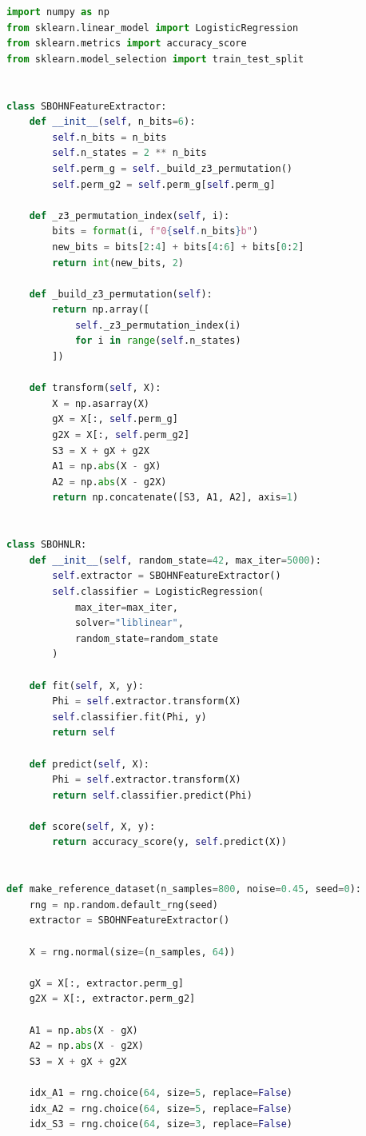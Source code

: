 \documentclass[11pt,a4paper]{report}
\begin{document}
\label{app:ch3-lst14}
\begin{lstlisting}[language=Python]
import numpy as np
from sklearn.linear_model import LogisticRegression
from sklearn.metrics import accuracy_score
from sklearn.model_selection import train_test_split


class SBOHNFeatureExtractor:
    def __init__(self, n_bits=6):
        self.n_bits = n_bits
        self.n_states = 2 ** n_bits
        self.perm_g = self._build_z3_permutation()
        self.perm_g2 = self.perm_g[self.perm_g]

    def _z3_permutation_index(self, i):
        bits = format(i, f"0{self.n_bits}b")
        new_bits = bits[2:4] + bits[4:6] + bits[0:2]
        return int(new_bits, 2)

    def _build_z3_permutation(self):
        return np.array([
            self._z3_permutation_index(i)
            for i in range(self.n_states)
        ])

    def transform(self, X):
        X = np.asarray(X)
        gX = X[:, self.perm_g]
        g2X = X[:, self.perm_g2]
        S3 = X + gX + g2X
        A1 = np.abs(X - gX)
        A2 = np.abs(X - g2X)
        return np.concatenate([S3, A1, A2], axis=1)


class SBOHNLR:
    def __init__(self, random_state=42, max_iter=5000):
        self.extractor = SBOHNFeatureExtractor()
        self.classifier = LogisticRegression(
            max_iter=max_iter,
            solver="liblinear",
            random_state=random_state
        )

    def fit(self, X, y):
        Phi = self.extractor.transform(X)
        self.classifier.fit(Phi, y)
        return self

    def predict(self, X):
        Phi = self.extractor.transform(X)
        return self.classifier.predict(Phi)

    def score(self, X, y):
        return accuracy_score(y, self.predict(X))


def make_reference_dataset(n_samples=800, noise=0.45, seed=0):
    rng = np.random.default_rng(seed)
    extractor = SBOHNFeatureExtractor()

    X = rng.normal(size=(n_samples, 64))

    gX = X[:, extractor.perm_g]
    g2X = X[:, extractor.perm_g2]

    A1 = np.abs(X - gX)
    A2 = np.abs(X - g2X)
    S3 = X + gX + g2X

    idx_A1 = rng.choice(64, size=5, replace=False)
    idx_A2 = rng.choice(64, size=5, replace=False)
    idx_S3 = rng.choice(64, size=3, replace=False)


\end{lstlisting}
\end{document}
